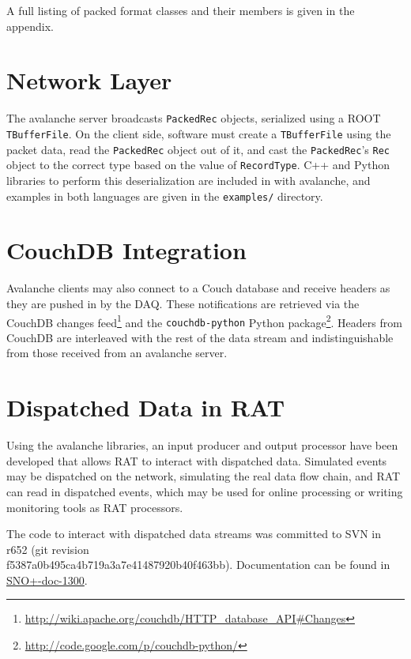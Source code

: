 \documentclass{article}
\begin{document}
A full listing of packed format classes and their members is given in the appendix.

\section{Network Layer}
The avalanche server broadcasts {\tt PackedRec} objects, serialized using a ROOT {\tt TBufferFile}. On the client side, software must create a {\tt TBufferFile} using the packet data, read the {\tt PackedRec} object out of it, and cast the {\tt PackedRec}'s {\tt Rec} object to the correct type based on the value of {\tt RecordType}. C++ and Python libraries to perform this deserialization are included in with avalanche, and examples in both languages are given in the {\tt examples/} directory.

\section{CouchDB Integration}
Avalanche clients may also connect to a Couch database and receive headers as they are pushed in by the DAQ. These notifications are retrieved via the CouchDB changes feed\footnote{\href{http://wiki.apache.org/couchdb/HTTP\_database\_API\#Changes}{http://wiki.apache.org/couchdb/HTTP\_database\_API\#Changes}} and the {\tt couchdb-python} Python package\footnote{\href{http://code.google.com/p/couchdb-python/}{http://code.google.com/p/couchdb-python/}}. Headers from CouchDB are interleaved with the rest of the data stream and indistinguishable from those received from an avalanche server.

\section{Dispatched Data in RAT}
Using the avalanche libraries, an input producer and output processor have been developed that allows RAT to interact with dispatched data. Simulated events may be dispatched on the network, simulating the real data flow chain, and RAT can read in dispatched events, which may be used for online processing or writing monitoring tools as RAT processors.

The code to interact with dispatched data streams was committed to SVN in r652 (git revision\\ f5387a0b495ca4b719a3a7e41487920b40f463bb). Documentation can be found in \href{https://www.snolab.ca/snoplus/private/DocDB/cgi/ShowDocument?docid=1300}{SNO+-doc-1300}.
\end{document}
